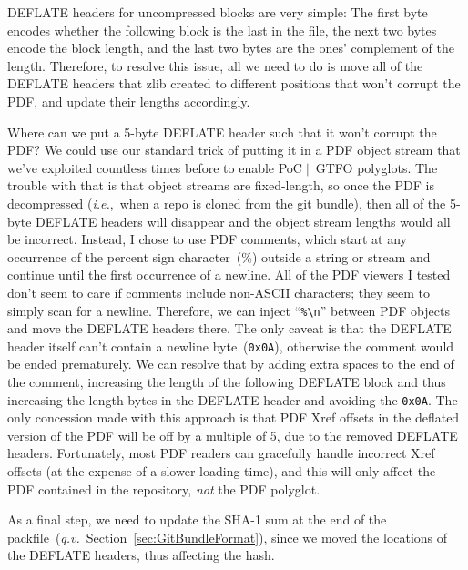 \documentclass{article}
\begin{document}
DEFLATE headers for uncompressed blocks are very simple: The first
byte encodes whether the following block is the last in the file, the
next two bytes encode the block length, and the last two bytes are the
ones' complement of the length.  Therefore, to resolve this issue, all
we need to do is move all of the DEFLATE headers that zlib created to
different positions that won't corrupt the PDF, and update their
lengths accordingly.

Where can we put a 5-byte DEFLATE header such that it won't corrupt
the PDF? We could use our standard trick of putting it in a PDF object
stream that we've exploited countless times before to enable
PoC$\|$GTFO polyglots. The trouble with that is that object streams
are fixed-length, so once the PDF is decompressed (\textit{i.e.},~when
a repo is cloned from the git bundle), then all of the 5-byte DEFLATE
headers will disappear and the object stream lengths would all be
incorrect. Instead, I chose to use PDF comments, which start at any
occurrence of the percent sign character~(\%) outside a string or
stream and continue until the first occurrence of a newline.  All of
the PDF viewers I tested don't seem to care if comments include
non-ASCII characters; they seem to simply scan for a
newline. Therefore, we can inject ``\texttt{\%\textbackslash n}''
between PDF objects and move the DEFLATE headers there. The only
caveat is that the DEFLATE header itself can't contain a newline
byte~(\texttt{0x0A}), otherwise the comment would be ended
prematurely.  We can resolve that by adding extra spaces to the end of
the comment, increasing the length of the following DEFLATE block and
thus increasing the length bytes in the DEFLATE header and avoiding
the \texttt{0x0A}. The only concession made with this approach is that
PDF Xref offsets in the deflated version of the PDF will be off by a
multiple of 5, due to the removed DEFLATE headers. Fortunately, most
PDF readers can gracefully handle incorrect Xref offsets (at the
expense of a slower loading time), and this will only affect the PDF
contained in the repository, \emph{not} the PDF polyglot.

As a final step, we need to update the SHA-1 sum at the end of the
packfile~(\textit{q.v.}~Section~\ref{sec:GitBundleFormat}), since we
moved the locations of the DEFLATE headers, thus affecting the hash.
\end{document}
